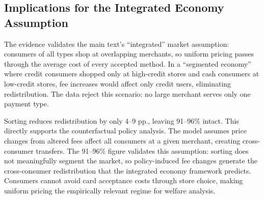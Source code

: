 \documentclass[main.tex]{subfiles}
\begin{document}
\begin{table}[ht!]
\caption{Ratio of welfare lost with actual sorting to homogeneous-merchant baseline.
Rows indicate the consumer type bearing the welfare loss, and columns indicate the fee increased by 1 pp.
Diagonal cells (Debit/Debit, Credit/Credit) measure own-type amplification from sorting. Off-diagonal cells measure cross-consumer redistribution attenuation.
Cash has no interchange fee and therefore no diagonal entry.}
\centering
    \begin{minipage}{0.5\textwidth}
    \label{tab:welfare_ratio}
    \centering
    
    \vspace{4pt}
    
    \end{minipage}\hfill
    \begin{minipage}{0.5\textwidth}
    \centering
    
    \vspace{4pt}
    
    \end{minipage}
\end{table}

\subsection{Implications for the Integrated Economy Assumption}

The evidence validates the main text's ``integrated'' market assumption: consumers of all types shop at overlapping merchants, so uniform pricing passes through the average cost of every accepted method.
In a ``segmented economy'' where credit consumers shopped only at high-credit stores and cash consumers at low-credit stores, fee increases would affect only credit users, eliminating redistribution.
The data reject this scenario: no large merchant serves only one payment type.

Sorting reduces redistribution by only 4--9 pp., leaving 91--96\% intact.
This directly supports the counterfactual policy analysis.
The model assumes price changes from altered fees affect all consumers at a given merchant, creating cross-consumer transfers.
The 91--96\% figure validates this assumption: sorting does not meaningfully segment the market, so policy-induced fee changes generate the cross-consumer redistribution that the integrated economy framework predicts.
Consumers cannot avoid card acceptance costs through store choice, making uniform pricing the empirically relevant regime for welfare analysis.
\end{document}
